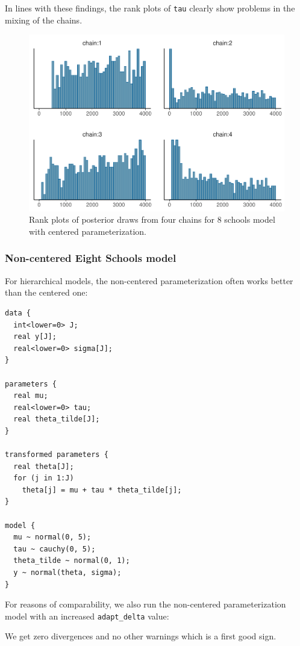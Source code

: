 \documentclass[american,]{article}
\begin{document}
In lines with these findings, the rank plots of \texttt{tau} clearly
show problems in the mixing of the chains.

\begin{figure}[tp]
  \centering
  \includegraphics[width=0.6\linewidth]{graphics/hist-fit-cp-1.pdf}
  \caption{Rank plots of posterior draws from four chains for 8 schools model with centered parameterization.}
\end{figure}

\FloatBarrier

\hypertarget{non-centered-eight-schools-model}{%
\subsubsection{Non-centered Eight Schools
model}\label{non-centered-eight-schools-model}}

For hierarchical models, the non-centered parameterization often works
better than the centered one:

\begin{verbatim}
data {
  int<lower=0> J;
  real y[J];
  real<lower=0> sigma[J];
}

parameters {
  real mu;
  real<lower=0> tau;
  real theta_tilde[J];
}

transformed parameters {
  real theta[J];
  for (j in 1:J)
    theta[j] = mu + tau * theta_tilde[j];
}

model {
  mu ~ normal(0, 5);
  tau ~ cauchy(0, 5);
  theta_tilde ~ normal(0, 1);
  y ~ normal(theta, sigma);
}
\end{verbatim}

For reasons of comparability, we also run the non-centered
parameterization model with an increased \texttt{adapt\_delta} value:

We get zero divergences and no other warnings which is a first good
sign.
\end{document}
